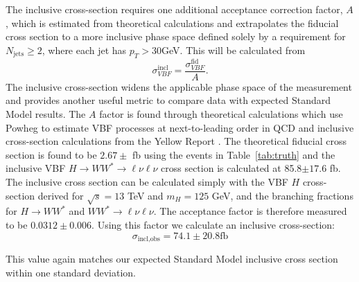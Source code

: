 The inclusive cross-section requires one additional acceptance correction factor, $A$, which is estimated from theoretical calculations and extrapolates the fiducial cross section to a more inclusive phase space defined solely by a requirement for $N_{\text{jets}}\geq2$, where each jet has $p_T>30$GeV. This will be calculated from
\begin{equation}
\sigma_{VBF}^{\text{incl}} = \frac{\sigma_{VBF}^{\text{fid}}}{A}.
\end{equation}
The inclusive cross-section widens the applicable phase space of the measurement and provides another useful metric to compare data with expected Standard Model results. The $A$ factor is found through theoretical calculations which use Powheg to estimate VBF processes at next-to-leading order in QCD and inclusive cross-section calculations from the Yellow Report \cite{LHCCrossSectionWG}. The theoretical fiducial cross section is found to be $2.67\pm$ fb using the events in Table~\ref{tab:truth} and the inclusive VBF $H\rightarrow WW^*\rightarrow \ell\nu\ell\nu$ cross section is calculated at 85.8$\pm 17.6$ fb. The inclusive cross section can be calculated simply with the VBF $H$ cross-section derived for $\sqrt{s}=13$ TeV and $m_H=125$ GeV, and the branching fractions for $H\rightarrow WW^*$ and $WW^*\rightarrow\ell\nu\ell\nu$.  The acceptance factor is therefore measured to be $0.0312 \pm 0.006$. Using this factor we calculate an inclusive cross-section:
\begin{equation}
\sigma_{\text{incl,obs}} = 74.1 \pm 20.8 \text{fb}
\end{equation} 

This value again matches our expected Standard Model inclusive cross section within one standard deviation.  

